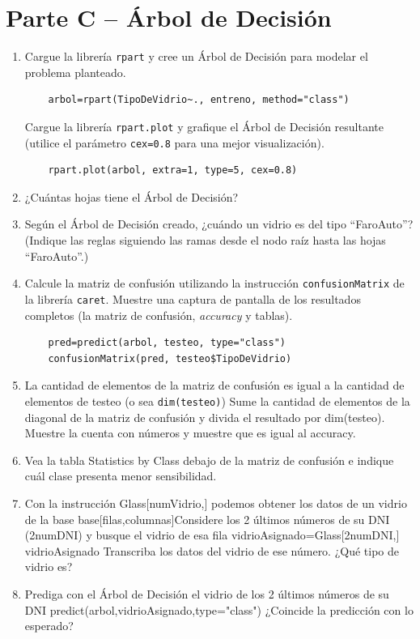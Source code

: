 \section*{Parte C – Árbol de Decisión}

\begin{enumerate}
    \item Cargue la librería \texttt{rpart} y cree un Árbol de Decisión para modelar el problema planteado.
    \begin{verbatim}
    arbol=rpart(TipoDeVidrio~., entreno, method="class")
    \end{verbatim}
    Cargue la librería \texttt{rpart.plot} y grafique el Árbol de Decisión resultante (utilice el parámetro \texttt{cex=0.8} para una mejor visualización).
    \begin{verbatim}
    rpart.plot(arbol, extra=1, type=5, cex=0.8)
    \end{verbatim}
    
    \item ¿Cuántas hojas tiene el Árbol de Decisión?
    
    \item Según el Árbol de Decisión creado, ¿cuándo un vidrio es del tipo “FaroAuto”? (Indique las reglas siguiendo las ramas desde el nodo raíz hasta las hojas “FaroAuto”.)
    
    \item Calcule la matriz de confusión utilizando la instrucción \texttt{confusionMatrix} de la librería \texttt{caret}. Muestre una captura de pantalla de los resultados completos (la matriz de confusión, \textit{accuracy} y tablas).
    \begin{verbatim}
    pred=predict(arbol, testeo, type="class")
    confusionMatrix(pred, testeo$TipoDeVidrio)
    \end{verbatim}
    
    \item La cantidad de elementos de la matriz de confusión es igual a la cantidad de elementos de testeo (o sea \texttt{dim(testeo)}) Sume la cantidad de elementos de la diagonal de la matriz de confusión y divida el resultado por dim(testeo).
Muestre la cuenta con números y muestre que es igual al accuracy.
\item Vea la tabla Statistics by Class debajo de la matriz de confusión e indique cuál clase presenta menor sensibilidad.
\item Con la instrucción Glass[numVidrio,] podemos obtener los datos de un vidrio de la base base[filas,columnas]Considere los 2 últimos números de su DNI (2numDNI) y busque el vidrio de esa fila
vidrioAsignado=Glass[2numDNI,] vidrioAsignado
Transcriba los datos del vidrio de ese número. ¿Qué tipo de vidrio es?
\item Prediga con el Árbol de Decisión el vidrio de los 2 últimos números de su DNI predict(arbol,vidrioAsignado,type="class")
¿Coincide la predicción con lo esperado?
\end{enumerate}

